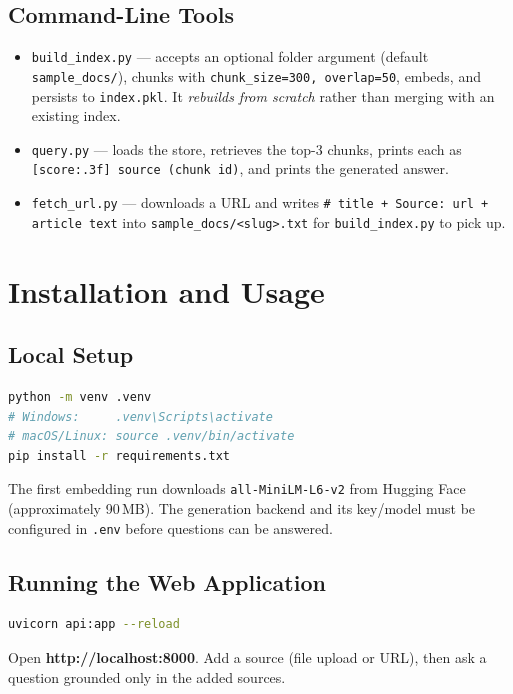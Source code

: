 \documentclass[11pt,a4paper]{article}
\newcommand{\code}[1]{\texttt{#1}}
\begin{document}
\subsection{Command-Line Tools}
\begin{itemize}
  \item \code{build\_index.py} --- accepts an optional folder argument
        (default \code{sample\_docs/}), chunks with
        \code{chunk\_size=300, overlap=50}, embeds, and persists to
        \code{index.pkl}. It \emph{rebuilds from scratch} rather than
        merging with an existing index.
  \item \code{query.py} --- loads the store, retrieves the top-3 chunks,
        prints each as \code{[score:.3f] source (chunk id)}, and prints the
        generated answer.
  \item \code{fetch\_url.py} --- downloads a URL and writes
        \code{\# title + Source: url + article text} into
        \code{sample\_docs/<slug>.txt} for \code{build\_index.py} to pick up.
\end{itemize}

\section{Installation and Usage}

\subsection{Local Setup}
\begin{lstlisting}[language=bash, style=bashstyle]
python -m venv .venv
# Windows:     .venv\Scripts\activate
# macOS/Linux: source .venv/bin/activate
pip install -r requirements.txt
\end{lstlisting}

The first embedding run downloads \texttt{all-MiniLM-L6-v2} from Hugging
Face (approximately 90\,MB). The generation backend and its key/model must be
configured in \code{.env} before questions can be answered.

\subsection{Running the Web Application}
\begin{lstlisting}[language=bash, style=bashstyle]
uvicorn api:app --reload
\end{lstlisting}
Open \textbf{http://localhost:8000}. Add a source (file upload or URL), then
ask a question grounded only in the added sources.
\end{document}
